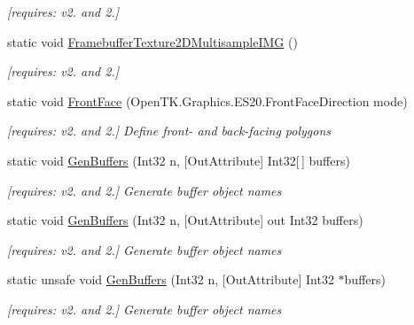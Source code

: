 \begin{DoxyCompactItemize}
\begin{DoxyCompactList}\small\item\em \mbox{[}requires\-: v2. and 2.\mbox{]}\end{DoxyCompactList}\item 
static void \hyperlink{class_open_t_k_1_1_graphics_1_1_e_s20_1_1_g_l_a74955c863d3a3aa950ec4daad8374a6b}{Framebuffer\-Texture2\-D\-Multisample\-I\-M\-G} ()
\begin{DoxyCompactList}\small\item\em \mbox{[}requires\-: v2. and 2.\mbox{]}\end{DoxyCompactList}\item 
static void \hyperlink{class_open_t_k_1_1_graphics_1_1_e_s20_1_1_g_l_a17b5c4330bdb9d222d0c8de8d8a060fa}{Front\-Face} (Open\-T\-K.\-Graphics.\-E\-S20.\-Front\-Face\-Direction mode)
\begin{DoxyCompactList}\small\item\em \mbox{[}requires\-: v2. and 2.\mbox{]} Define front-\/ and back-\/facing polygons \end{DoxyCompactList}\item 
static void \hyperlink{class_open_t_k_1_1_graphics_1_1_e_s20_1_1_g_l_a48f0a7c043731d1d3b228a87af32a38f}{Gen\-Buffers} (Int32 n, \mbox{[}Out\-Attribute\mbox{]} Int32\mbox{[}$\,$\mbox{]} buffers)
\begin{DoxyCompactList}\small\item\em \mbox{[}requires\-: v2. and 2.\mbox{]} Generate buffer object names \end{DoxyCompactList}\item 
static void \hyperlink{class_open_t_k_1_1_graphics_1_1_e_s20_1_1_g_l_a6b3124f437517a69cdd7c205f01c5df1}{Gen\-Buffers} (Int32 n, \mbox{[}Out\-Attribute\mbox{]} out Int32 buffers)
\begin{DoxyCompactList}\small\item\em \mbox{[}requires\-: v2. and 2.\mbox{]} Generate buffer object names \end{DoxyCompactList}\item 
static unsafe void \hyperlink{class_open_t_k_1_1_graphics_1_1_e_s20_1_1_g_l_a13381160b1d7620689d6e6eb30163b0b}{Gen\-Buffers} (Int32 n, \mbox{[}Out\-Attribute\mbox{]} Int32 $\ast$buffers)
\begin{DoxyCompactList}\small\item\em \mbox{[}requires\-: v2. and 2.\mbox{]} Generate buffer object names \end{DoxyCompactList}\item 

\end{DoxyCompactItemize}
